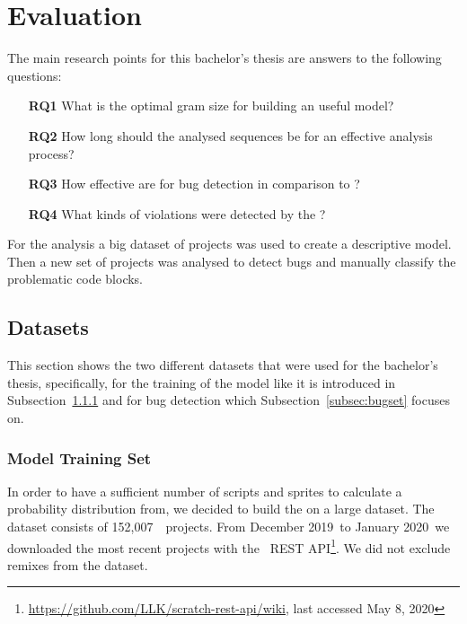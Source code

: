 
\newcommand{\numlarge}{152,007}
\newcommand{\monthstart}{December 2019}
\newcommand{\monthend}{January 2020}
\newcommand{\parsingexcp}{114}
\newcommand{\successfullyanalysed}{151,893}
\newcommand{\foundbugs}{100}
\newcommand{\modelduration}{72 h}
\newcommand{\bugfindingduration}{5 min}

\chapter{Evaluation}\label{chap:evaluation}

The main research points for this bachelor's thesis are answers to the following questions:
\begin{itemize}
\item[\textbf{RQ1}] What is the optimal gram size for building an useful model?
\item[\textbf{RQ2}] How long should the analysed sequences be for an effective analysis process?
\item[\textbf{RQ3}] How effective are  for bug detection in comparison to \litterbox{}?
\item[\textbf{RQ4}] What kinds of violations were detected by the \ngram{}?
\end{itemize}
For the analysis a big dataset of  projects was used to create a descriptive model. Then a new set of projects was analysed to detect bugs and manually classify the problematic code blocks.


\section{Datasets}\label{sec:dataset}
This section shows the two different datasets that were used for the bachelor's thesis, specifically, for the training of the model like it is introduced in Subsection~\ref{subsec:trainingset} and for bug detection which Subsection~\ref{subsec:bugset} focuses on.

\subsection{Model Training Set}\label{subsec:trainingset}
In order to have a sufficient number of scripts and sprites to calculate a probability distribution from, we decided to build the \ngram{} on a large dataset. The dataset consists of \numlarge\ \scratch\ projects. From \monthstart\ to \monthend\ we downloaded the most recent projects with the \scratch\ REST API\footnote{\url{https://github.com/LLK/scratch-rest-api/wiki}, last accessed May 8, 2020}. We did not exclude remixes from the dataset.

